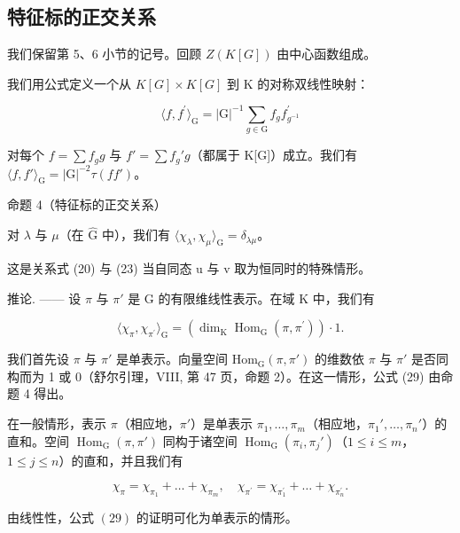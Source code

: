 \subsection{特征标的正交关系}

我们保留第 5、6 小节的记号。回顾 \(Z(K[G])\) 由中心函数组成。

我们用公式定义一个从 \(K[G] \times K[G]\) 到 K 的对称双线性映射：

\[
\langle f, f ^ {\prime} \rangle_ {\mathrm{G}} = | \mathrm{G} | ^ {- 1} \sum_ {g \in \mathrm{G}} f _ {g} f _ {g ^ {- 1}} ^ {\prime}\tag{28}
\]

对每个 \(f = \sum f_{g}g\) 与 \(f' = \sum f_{g}'g\)（都属于 K{[}G{]}）成立。我们有 \(\langle f, f' \rangle_{\mathrm{G}} = |\mathrm{G}|^{-2}\tau (ff')\)。

命题 4（特征标的正交关系）

对 \(\lambda\) 与 \(\mu\)（在 \(\hat{\mathrm{G}}\) 中），我们有 \(\langle \chi_{\lambda},\chi_{\mu}\rangle_{\mathrm{G}} = \delta_{\lambda \mu}\)。

这是关系式 (20) 与 (23) 当自同态 u 与 v 取为恒同时的特殊情形。

推论. —— 设 \(\pi\) 与 \(\pi'\) 是 G 的有限维线性表示。在域 K 中，我们有

\[
\langle \chi_ {\pi}, \chi_ {\pi^ {\prime}} \rangle_ {\mathrm{G}} = (\dim_ {\mathrm{K}} \operatorname{Hom} _ {\mathrm{G}} (\pi , \pi^ {\prime})) \cdot 1.\tag{29}
\]

我们首先设 \(\pi\) 与 \(\pi'\) 是单表示。向量空间 \(\mathrm{Hom}_{\mathrm{G}}(\pi, \pi')\) 的维数依 \(\pi\) 与 \(\pi'\) 是否同构而为 1 或 0（舒尔引理，VIII, 第 47 页，命题 2）。在这一情形，公式 (29) 由命题 4 得出。

在一般情形，表示 \(\pi\)（相应地，\(\pi'\)）是单表示 \(\pi_{1},\ldots,\pi_{m}\)（相应地，\(\pi_{1}',\ldots,\pi_{n}'\)）的直和。空间 \(\operatorname{Hom}_{\mathrm{G}}(\pi,\pi')\) 同构于诸空间 \(\operatorname{Hom}_{\mathrm{G}}(\pi_{i},\pi_{j}')\)（\(1\leqslant i\leqslant m\)，\(1\leqslant j\leqslant n\)）的直和，并且我们有

\[
\chi_ {\pi} = \chi_ {\pi_ {1}} + \dots + \chi_ {\pi_ {m}}, \quad \chi_ {\pi^ {\prime}} = \chi_ {\pi_ {1} ^ {\prime}} + \dots + \chi_ {\pi_ {n} ^ {\prime}}.
\]

由线性性，公式 \((29)\) 的证明可化为单表示的情形。

